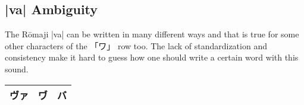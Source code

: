 \subsection{|va|  Ambiguity} \label{subsec:VaAmbiguity}

The Rōmaji |va| can be written in many different ways and that is true for some
other characters of the {「ワ」} row too. The lack of standardization and
consistency make it hard to guess how one should write a certain word with this
sound.

\bigskip

\begin{center}
\Huge
\begin{tabular}{|c|c|c|}\hline
ヴァ&ヷ&バ\\\hline
\end{tabular}
\end{center}


